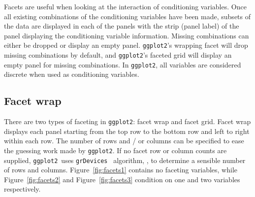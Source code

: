 \documentclass[stat,dissertation]{puthesis}\usepackage[]{graphicx}\usepackage{xcolor}
\newcommand{\pkg}[1]{\texttt{#1}}
\newcommand{\ggplot}{\pkg{ggplot2}}
\begin{document}
Facets are useful when looking at the interaction of conditioning variables.  Once all existing combinations of the conditioning variables have been made, subsets of the data are displayed in each of the panels with the strip (panel label) of the panel displaying the conditioning variable information.  Missing combinations can either be dropped or display an empty panel.  \ggplot's wrapping facet will drop missing combinations by default, and \ggplot's faceted grid will display an empty panel for missing combinations.  In \ggplot, all variables are considered discrete when used as conditioning variables.


\subsection{Facet wrap}

There are two types of faceting in \ggplot: facet wrap and facet grid.  Facet wrap displays each panel starting from the top row to the bottom row and left to right within each row.  The number of rows and / or columns can be specified to ease the guessing work made by \ggplot.  If no facet row or column counts are supplied, \ggplot~uses \pkg{grDevices}~\cite{r_project} algorithm, , to determine a sensible number of rows and columns.  Figure~\ref{fig:facets1} contains no faceting variables, while Figure~\ref{fig:facets2} and Figure~\ref{fig:facets3} condition on one and two variables respectively.
\end{document}
